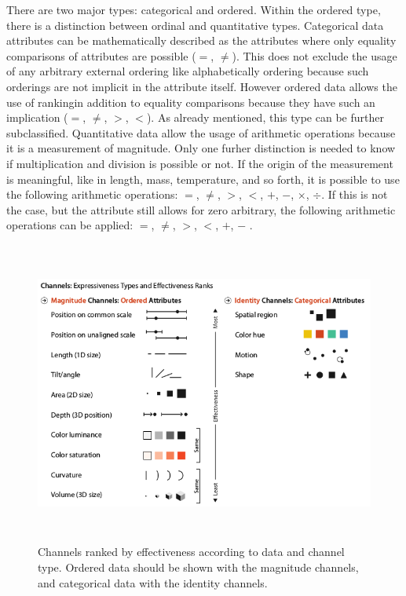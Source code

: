 There are two major types: categorical and ordered. Within the ordered type, there is a distinction between ordinal and quantitative types. Categorical data attributes can be mathematically described as the attributes where only equality comparisons of attributes are possible ($=$, $\neq$). This does not exclude the usage of any arbitrary external ordering like alphabetically ordering because such orderings are not implicit in the attribute itself. However ordered data allows the use of rankingin addition to equality comparisons because they have such an implication ($=$, $\neq$, $>$, $<$). As already mentioned, this type can be further subclassified. Quantitative data allow the usage of arithmetic operations because it is a measurement of magnitude. Only one furher distinction is needed to know if multiplication and division is possible or not. If the origin of the measurement is meaningful, like in length, mass, temperature, and so forth, it is possible to use the following arithmetic operations: $=$, $\neq$, $>$, $<$, $+$, $-$, $\times$, $\div$. If this is not the case, but the attribute still allows for zero arbitrary, the following arithmetic operations can be applied: $=$, $\neq$, $>$, $<$, $+$, $-$ .

\begin{figure}[!htb]
\centering
\includegraphics[height=10cm,keepaspectratio]{images/va/channels-ranked.png}
\caption[
    Channels ranked by effectiveness according to data and channel type. Ordered data should be shown with the magnitude channels, and categorical data with the identity channels .
]{Channels ranked by effectiveness according to data and channel type. Ordered data should be shown with the magnitude channels, and categorical data with the identity channels.}
\label{fig:va-channels-ranked}
\end{figure}

